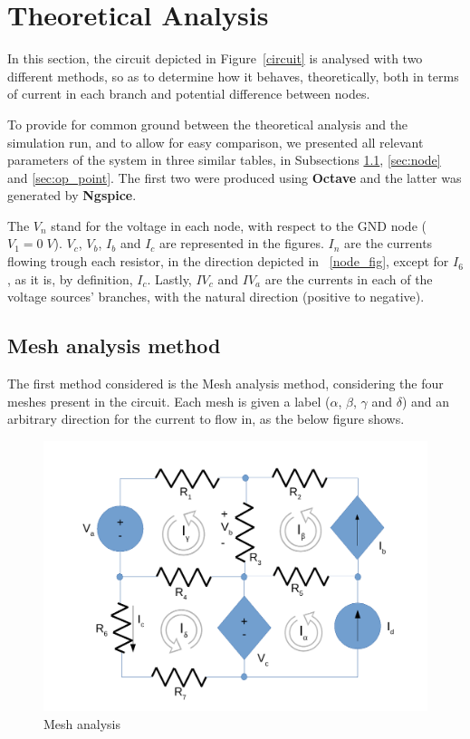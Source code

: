 \section{Theoretical Analysis}
\label{sec:analysis}

In this section, the circuit depicted in Figure~\ref{circuit} is analysed with two different methods, so as to determine how it behaves, theoretically, both in terms of current in each branch and potential difference between nodes.

To provide for common ground between the theoretical analysis and the simulation run, and to allow for easy comparison, we presented all relevant parameters of the system in three similar tables, in Subsections \ref{sec:mesh}, \ref{sec:node} and \ref{sec:op_point}. The first two were produced using {\bf Octave} and the latter was generated by {\bf Ngspice}.

The $V_n$ stand for the voltage in each node, with respect to the GND node ($V_1=0\;V$). $V_c$, $V_b$, $I_b$ and $I_c$ are represented in the figures. $I_n$ are the currents flowing trough each resistor, in the direction depicted in ~\ref{node_fig}, except for $I_6$, as it is, by definition, $I_c$. Lastly, $IV_c$ and $IV_a$ are the currents in each of the voltage sources' branches, with the natural direction (positive to negative).

\subsection{Mesh analysis method}
\label{sec:mesh}

The first method considered is the Mesh analysis method, considering the four meshes present in the circuit. Each mesh is given a label ($\alpha$, $\beta$, $\gamma$ and $\delta$) and an arbitrary direction for the current to flow in, as the below figure shows.

\begin{figure}[H]
  \centering
  \includegraphics[width=0.5\linewidth]{mesh.pdf}
  \caption{Mesh analysis}
  \label{mesh_fig}
\end{figure}

